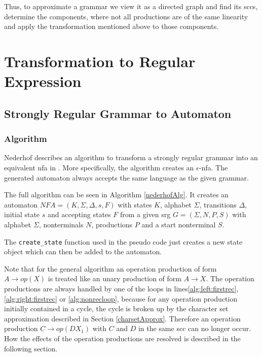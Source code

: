 Thus, to approximate a grammar we view it as a directed graph and find its \acp{scc}, determine the components, where not all productions are of the same linearity and apply the transformation mentioned above to those components.


\section{Transformation to Regular Expression}

\subsection{Strongly Regular Grammar to Automaton}

\subsubsection{Algorithm}

Nederhof describes an algorithm to transform a strongly regular grammar into an equivalent \ac{nfa} in \cite{nederhof}.
More specifically, the algorithm creates an $\epsilon$-\ac{nfa}. The generated automaton always accepts the same language as the given grammar.

The full algorithm can be seen in Algorithm \ref{nederhofAlg}. It creates an automaton $NFA = (K,\Sigma, \Delta, s, F)$ with states $K$, alphabet $\Sigma$, transitions $\Delta$, initial state $s$ and accepting states $F$ from a given \ac{srg} $G = (\Sigma, N, P, S)$ with alphabet $\Sigma$, nonterminals $N$, productions $P$ and a start nonterminal $S$.

The \texttt{create\_state} function used in the pseudo code just creates a new state object which can then be added to the automaton.

Note that for the general algorithm an operation production of form $A \rightarrow op(X)$ is treated like an unary production of form $A \rightarrow X$. The operation productions are always handled by one of the loops in lines\ref{alg:left:firstrec}, \ref{alg:right:firstrec} or \ref{alg:nonrecloop}, because for any operation production initially contained in a cycle, the cycle is broken up by the character set approximation described in Section \ref{charsetApprox}.
Therefore an operation production $C \rightarrow op(DX_1)$ with $C$ and $D$ in the same \ac{scc} can no longer occur.
How the effects of the operation productions are resolved is described in the following section. 

